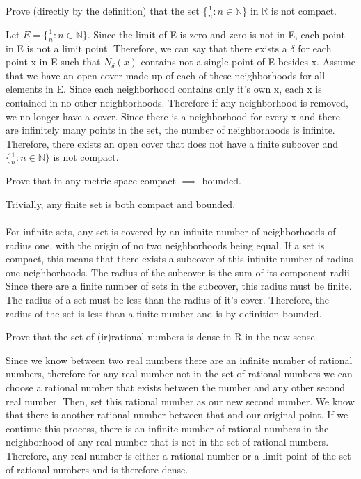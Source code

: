 \documentclass[12pt]{article}
\newcommand{\N}{\mathbb{N}}
\newenvironment{exercise}[2][Exercise]{\begin{trivlist}
\item[\hskip \labelsep {\bfseries #1}\hskip \labelsep {\bfseries #2.}]}{\end{trivlist}}
\begin{document}
\begin{exercise}{2.4}
Prove (directly by the definition) that the set \{$\frac{1}{n}: n \in \N $\} in $\mathbb{R}$ is not compact.
\end{exercise}
Let $E = \{\frac{1}{n}: n \in \N \}$. Since the limit of E is zero and zero is not in E, each point in E is not a limit point. Therefore, we can say that there exists a $\delta$ for each point x in E such that $N_{\delta}(x)$ contains not a single point of E besides x. Assume that we have an open cover made up of each of these neighborhoods for all elements in E. Since each neighborhood contains only it's own x, each x is contained in no other neighborhoods. Therefore if any neighborhood is removed, we no longer have a cover. Since there is a neighborhood for every x and there are infinitely many points in the set, the number of neighborhoods is infinite. Therefore, there exists an open cover that does not have a finite subcover and $\{\frac{1}{n}: n \in \N \}$ is not compact.

\begin{exercise}{2.5}
Prove that in any metric space compact $\implies$ bounded.
\end{exercise}
Trivially, any finite set is both compact and bounded. \\
\\
For infinite sets, any set is covered by an infinite number of neighborhoods of radius one, with the origin of no two neighborhoods being equal. If a set is compact, this means that there exists a subcover of this infinite number of radius one neighborhoods. The radius of the subcover is the sum of its component radii. Since there are a finite number of sets in the subcover, this radius must be finite. The radius of a set must be less than the radius of it's cover. Therefore, the radius of the set is less than a finite number and is by definition bounded.

\begin{exercise}{2.6}
Prove that the set of (ir)rational numbers is dense in R in the new sense. 
\end{exercise}
Since we know between two real numbers there are an infinite number of rational numbers, therefore for any real number not in the set of rational numbers we can choose a rational number that exists between the number and any other second real number. Then, set this rational number as our new second number. We know that there is another rational number between that and our original point. If we continue this process, there is an infinite number of rational numbers in the neighborhood of any real number that is not in the set of rational numbers. Therefore, any real number is either a rational number or a limit point of the set of rational numbers and is therefore dense.

 
\end{document}
